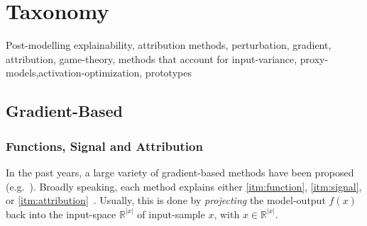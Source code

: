 \section{Taxonomy}
Post-modelling explainability, attribution methods, perturbation, gradient, attribution, game-theory, methods that account for input-variance, proxy-models,activation-optimization, prototypes

\subsection{Gradient-Based}
\blindtext[1]
\subsubsection{Functions, Signal and Attribution}
In the past years, a large variety of gradient-based methods have been proposed (e.g.~\cite{Bach.2015,Zeiler.2014,Springenberg.2015,Kindermans.2018,Lundberg.2017,Gurumoorthy.2017,Simonyan.2014,DanielSmilkov.,Sundararajan.2017,Landecker.2013,Zhang.2018,Shrikumar.,Selvaraju.2017}). Broadly speaking, each method explains either \ref{itm:function}, \ref{itm:signal}, or \ref{itm:attribution}~\cite{Kindermans.2018}. Usually, this is done by \textit{projecting} the model-output \(f(x)\) back into the input-space \(\mathbb{R}^{|x|}\) of input-sample \(x\), with \(x\in \mathbb{R}^{|x|}\).
